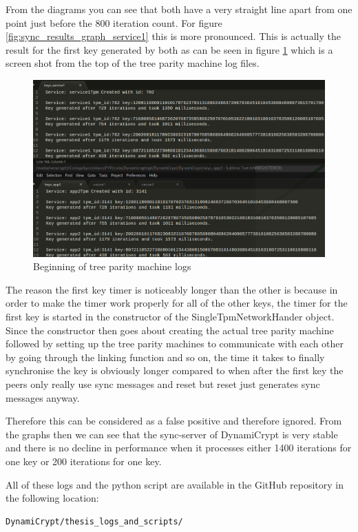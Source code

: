 From the diagrams you can see that both have a very straight line apart from one point just before the 800 iteration count. For figure \ref{fig:sync_results_graph_service1} this is more pronounced. This is actually the result for the first key generated by both as can be seen in figure \ref{fig:sync13} which is a screen shot from the top of the tree parity machine log files.

\begin{figure}[!h]
	\centering
	\includegraphics[width=1\textwidth]{Figures/sync13.png}
	\caption[Beginning of tree parity machine logs]{Beginning of tree parity machine logs}
	\label{fig:sync13}
\end{figure}
\FloatBarrier

The reason the first key timer is noticeably longer than the other is because in order to make the timer work properly for all of the other keys, the timer for the first key is started in the constructor of the SingleTpmNetworkHander object. Since the constructor then goes about creating the actual tree parity machine followed by setting up the tree parity machines to communicate with each other by going through the linking function and so on, the time it takes to finally synchronise the key is obviously longer compared to when after the first key the peers only really use sync messages and reset but reset just generates sync messages anyway. 

Therefore this can be considered as a false positive and therefore ignored. From the graphs then we can see that the sync-server of DynamiCrypt is very stable and there is no decline in performance when it processes either 1400 iterations for one key or 200 iterations for one key.

All of these logs and the python script are available in the GitHub repository in the following location:
\begin{lstlisting}
DynamiCrypt/thesis_logs_and_scripts/
\end{lstlisting}
